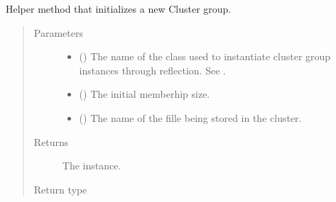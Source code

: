 \documentclass[letterpaper,10pt,english]{sphinxmanual}
\begin{document}
\begin{fulllineitems}
\begin{fulllineitems}
\label{\detokenize{app.domain:app.domain.master_servers.Master._new_cluster_group}}
Helper method that initializes a new Cluster group.
\begin{quote}\begin{description}
\item[{Parameters}] \leavevmode\begin{itemize}
\item {} 
 () \textendash{} The name of the class used to instantiate cluster group
instances through reflection. See {\hyperref[\detokenize{app.domain:module-app.domain.cluster_groups}]{}}.

\item {} 
 () \textendash{} The {\hyperref[\detokenize{app.domain:app.domain.cluster_groups.Cluster}]{}}
initial memberhip size.

\item {} 
 () \textendash{} The name of the fille being stored in the cluster.

\end{itemize}

\item[{Returns}] \leavevmode
The {\hyperref[\detokenize{app.domain:app.domain.cluster_groups.Cluster}]{}} instance.

\item[{Return type}] \leavevmode
{\hyperref[\detokenize{app:app.type_hints.ClusterType}]{}}

\end{description}\end{quote}


\end{fulllineitems}
\end{fulllineitems}
\end{document}
